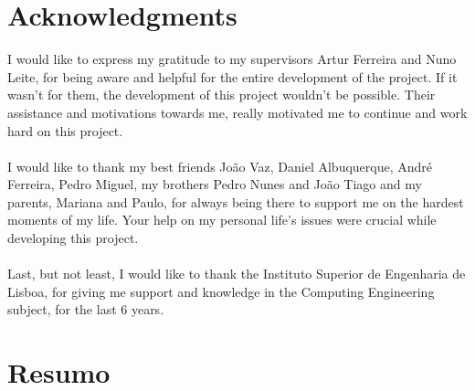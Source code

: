 \chapter*{Acknowledgments}

I would like to express my gratitude to my supervisors Artur Ferreira and Nuno Leite, for being aware and helpful for the entire development of the project. If it wasn't for them, the development of this project wouldn't be possible. Their assistance and motivations towards me, really motivated me to continue and work hard on this project.\\
\\
I would like to thank my best friends João Vaz, Daniel Albuquerque, André Ferreira, Pedro Miguel, my brothers Pedro Nunes and João Tiago and my parents, Mariana and Paulo, for always being there to support me on the hardest moments of my life. Your help on my personal life's issues were crucial while developing this project.\\
\\
Last, but not least, I would like to thank the Instituto Superior de Engenharia de Lisboa, for giving me support and knowledge in the Computing Engineering subject, for the last 6 years.
\
\chapter*{Resumo}

